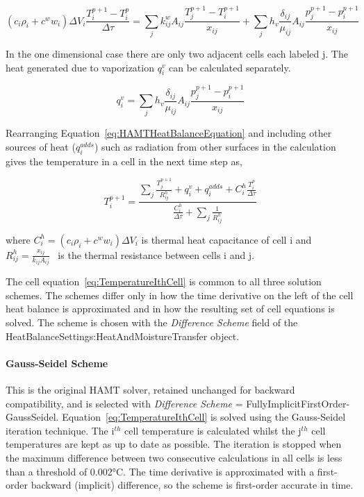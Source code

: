 \begin{equation}
\left( {{c_i}{\rho_i} + {c^w}{w_i}} \right)\Delta {V_i}\frac{{T_i^{p + 1} - T_i^p}}{{\Delta \tau }} = \sum\limits_j {k_{ij}^w{A_{ij}}\frac{{T_j^{p + 1} - T_i^{p + 1}}}{{{x_{ij}}}}}  + \sum\limits_j {{h_v}\frac{{{\delta_{ij}}}}{{{\mu_{ij}}}}{A_{ij}}\frac{{p_j^{p + 1} - p_i^{p + 1}}}{{{x_{ij}}}}}
\end{equation}

In the one dimensional case there are only two adjacent cells each labeled j. The heat generated due to vaporization \(q_i^v\) can be calculated separately.

\begin{equation}
q_i^v = \sum\limits_j {{h_v}\frac{{{\delta_{ij}}}}{{{\mu_{ij}}}}{A_{ij}}\frac{{p_j^{p + 1} - p_i^{p + 1}}}{{{x_{ij}}}}}
\end{equation}

Rearranging Equation~\ref{eq:HAMTHeatBalanceEquation} and including other sources of heat (\(q_i^{adds}\)) such as radiation from other surfaces in the calculation gives the temperature in a cell in the next time step as,

\begin{equation}
T_i^{p + 1} = \frac{{\sum\nolimits_j {\frac{{T_j^{p + 1}}}{{R_{ij}^h}}}  + q_i^v + q_i^{adds} + C_i^h\frac{{T_i^p}}{{\Delta \tau }}}}{{\frac{{C_i^h}}{{\Delta \tau }} + \sum\nolimits_j {\frac{1}{{R_{ij}^h}}} }}
\label{eq:TemperatureIthCell}
\end{equation}

where \(C_i^h = \left( {{c_i}{\rho_i} + {c^w}{w_i}} \right)\Delta {V_i}\) is thermal heat capacitance of cell i and \(R_{ij}^h = \frac{x_{ij}}{k_{ij}A_{ij}}\) ~is the thermal resistance between cells i and j.

The cell equation~\ref{eq:TemperatureIthCell} is common to all three solution schemes. The schemes differ only in how the time derivative on the left of the cell heat balance is approximated and in how the resulting set of cell equations is solved. The scheme is chosen with the \emph{Difference Scheme} field of the HeatBalanceSettings:HeatAndMoistureTransfer object.

\paragraph{Gauss-Seidel Scheme}\label{heat-transfer-gauss-seidel}

This is the original HAMT solver, retained unchanged for backward compatibility, and is selected with \emph{Difference Scheme} = FullyImplicitFirstOrder-GaussSeidel. Equation~\ref{eq:TemperatureIthCell} is solved using the Gauss-Seidel iteration technique. The i\(^{th}\) cell temperature is calculated whilst the j\(^{th}\) cell temperatures are kept as up to date as possible. The iteration is stopped when the maximum difference between two consecutive calculations in all cells is less than a threshold of 0.002°C. The time derivative is approximated with a first-order backward (implicit) difference, so the scheme is first-order accurate in time.

